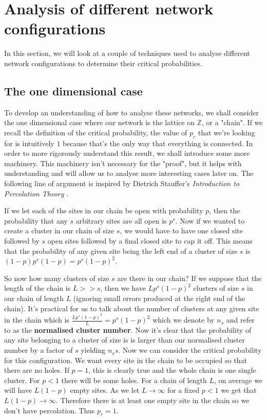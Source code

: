 \section{Analysis of different network configurations}
In this section, we will look at a couple of techniques used to analyse different network configurations to determine their critical probabilities.

\subsection{The one dimensional case}
To develop an understanding of how to analyse these networks, we shall consider the one dimensional case where our network is the lattice on $\mathbb{Z}$, or a "chain".
If we recall the definition of the critical probability, the value of $p_c$ that we're looking for is intuitively $1$ because that's the only way that everything is connected. In
order to more rigorously understand this result, we shall introduce some more
machinery. This machinery isn't necessary for the "proof", but it helps with understanding and will allow us to analyse more interesting cases later on. The following line of
argument is inspired by Dietrich Stauffer's \textit{Introduction to Percolation Theory} \cite{Stauffer}.

If we let each of the sites in our chain be open with probability $p$, then the probability that any $s$ arbitrary sites are all open is $p^s$. Now if we wanted to create a cluster
in our chain of size $s$, we would have to have one closed site followed by $s$ open sites followed by a final closed site to cap it off. This means that the probability of any
given site being the left end of a cluster of size $s$ is $(1-p)p^s(1-p) = p^s(1-p)^2$.

So now how many clusters of size $s$ are there in our chain? If we suppose that the length of the chain is $L >> s$, then we have $Lp^s(1-p)^2$ clusters of size $s$ in our chain of
length $L$ (ignoring small errors produced at the right end of the chain). It's practical for us to talk about the number of clusters at any given site in the chain which is
$\frac{Lp^s(1-p)^2}{L} = p^s(1-p)^2$ which we denote by $n_s$ and refer to as the \textbf{normalised cluster number}. Now it's clear that the probability of any site belonging to a
cluster of size is is larger than our normalised cluster number by a factor of $s$ yielding $n_ss$. Now we can consider the critical probability for this configuration. We want
every site in the chain to be occupied so that there are no holes. If $p = 1$, this is clearly true and the whole chain is one single cluster. For $p < 1$ there will be some holes.
For a chain of length $L$, on average we will have $L(1-p)$ empty sites. As we let $L \rightarrow \infty$ for a fixed $p < 1$ we get that $L(1-p) \rightarrow \infty$. Therefore
there is at least one empty site in the chain so we don't have percolation. Thus $p_c = 1$.

